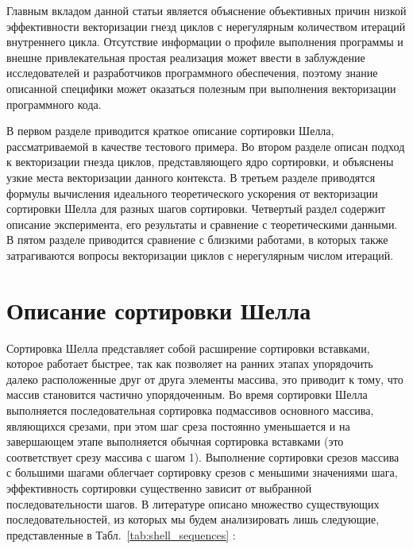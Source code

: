 \documentclass[utf8]{psta}
\begin{document}
Главным вкладом данной статьи является объяснение объективных причин низкой эффективности векторизации гнезд циклов с нерегулярным количеством итераций внутреннего цикла.
Отсутствие информации о профиле выполнения программы и внешне привлекательная простая реализация может ввести в заблуждение исследователей и разработчиков программного обеспечения, поэтому знание описанной специфики может оказаться полезным при выполнения векторизации программного кода.

В первом разделе приводится краткое описание сортировки Шелла, рассматриваемой в качестве тестового примера.
Во втором разделе описан подход к векторизации гнезда циклов, представляющего ядро сортировки, и объяснены узкие места векторизации данного контекста.
В третьем разделе приводятся формулы вычисления идеального теоретического ускорения от векторизации сортировки Шелла для разных шагов сортировки.
Четвертый раздел содержит описание эксперимента, его результаты и сравнение с теоретическими данными.
В пятом разделе приводится сравнение с близкими работами, в которых также затрагиваются вопросы векторизации циклов с нерегулярным числом итераций.

\section{Описание сортировки Шелла}

Сортировка Шелла \cite{Knuth} представляет собой расширение сортировки вставками, которое работает быстрее, так как позволяет на ранних этапах упорядочить далеко расположенные друг от друга элементы массива, это приводит к тому, что массив становится частично упорядоченным. 
Во время сортировки Шелла выполняется последовательная сортировка подмассивов основного массива, являющихся срезами, при этом шаг среза постоянно уменьшается и на завершающем этапе выполняется обычная сортировка вставками (это соответствует срезу массива с шагом 1).
Выполнение сортировки срезов массива с большими шагами облегчает сортировку срезов с меньшими значениями шага, эффективность сортировки существенно зависит от выбранной последовательности шагов. 
В литературе описано множество существующих последовательностей, из которых мы будем анализировать лишь следующие, представленные в Табл.~\ref{tab:shell_sequences} \cite{Pratt_seq,Hib_seq,Sedjw_seq}:
\end{document}
